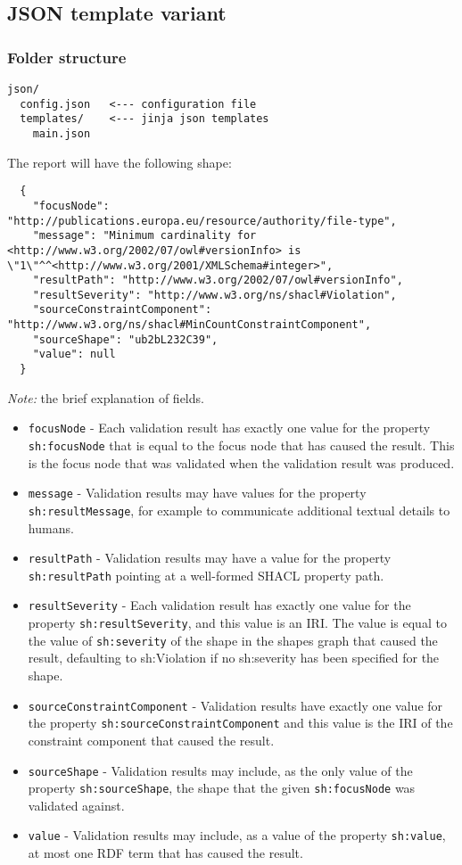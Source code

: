 \subsection{JSON template variant}
\subsubsection{Folder structure}

\begin{lstlisting}
json/
  config.json   <--- configuration file
  templates/    <--- jinja json templates
    main.json
\end{lstlisting}

The report will have the following shape:
\begin{lstlisting}
  {
    "focusNode": "http://publications.europa.eu/resource/authority/file-type",
    "message": "Minimum cardinality for <http://www.w3.org/2002/07/owl#versionInfo> is \"1\"^^<http://www.w3.org/2001/XMLSchema#integer>",
    "resultPath": "http://www.w3.org/2002/07/owl#versionInfo",
    "resultSeverity": "http://www.w3.org/ns/shacl#Violation",
    "sourceConstraintComponent": "http://www.w3.org/ns/shacl#MinCountConstraintComponent",
    "sourceShape": "ub2bL232C39",
    "value": null
  }
\end{lstlisting}

\textit{Note:} the brief explanation of fields.
\begin{itemize}
  \item \texttt{focusNode} - Each validation result has exactly one value for the property \texttt{sh:focusNode} that is equal to the focus node that has caused the result. This is the focus node that was validated when the validation result was produced.
  \item \texttt{message} - Validation results may have values for the property \texttt{sh:resultMessage}, for example to communicate additional textual details to humans.
  \item \texttt{resultPath} - Validation results may have a value for the property \texttt{sh:resultPath} pointing at a well-formed SHACL property path.
  \item \texttt{resultSeverity} - Each validation result has exactly one value for the property \texttt{sh:resultSeverity}, and this value is an IRI. The value is equal to the value of \texttt{sh:severity} of the shape in the shapes graph that caused the result, defaulting to sh:Violation if no sh:severity has been specified for the shape.
  \item \texttt{sourceConstraintComponent} - Validation results have exactly one value for the property \texttt{sh:sourceConstraintComponent} and this value is the IRI of the constraint component that caused the result.
  \item \texttt{sourceShape} - Validation results may include, as the only value of the property \texttt{sh:sourceShape}, the shape that the given \texttt{sh:focusNode} was validated against.
  \item \texttt{value} - Validation results may include, as a value of the property \texttt{sh:value}, at most one RDF term that has caused the result.
\end{itemize}

